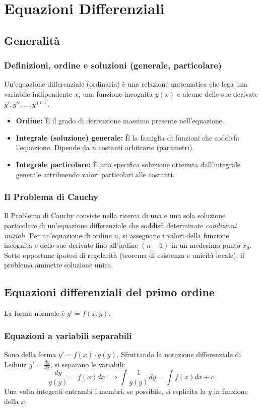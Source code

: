 \section{Equazioni Differenziali}
\subsection{Generalità}
\subsubsection{Definizioni, ordine e soluzioni (generale, particolare)}
Un'equazione differenziale (ordinaria) è una relazione matematica che lega una variabile indipendente $x$, una funzione incognita $y(x)$ e alcune delle sue derivate $y', y'', \dots, y^{(n)}$.
\begin{itemize}
    \item \textbf{Ordine:} È il grado di derivazione massimo presente nell'equazione.
    \item \textbf{Integrale (soluzione) generale:} È la famiglia di funzioni che soddisfa l'equazione. Dipende da $n$ costanti arbitrarie (parametri).
    \item \textbf{Integrale particolare:} È una specifica soluzione ottenuta dall'integrale generale attribuendo valori particolari alle costanti.
\end{itemize}

\subsubsection{Il Problema di Cauchy}
Il Problema di Cauchy consiste nella ricerca di una e una sola soluzione particolare di un'equazione differenziale che soddisfi determinate \textit{condizioni iniziali}. Per un'equazione di ordine $n$, si assegnano i valori della funzione incognita e delle sue derivate fino all'ordine $(n-1)$ in un medesimo punto $x_0$. Sotto opportune ipotesi di regolarità (teorema di esistenza e unicità locale), il problema ammette soluzione unica.

\subsection{Equazioni differenziali del primo ordine}
La forma normale è $y' = f(x, y)$.

\subsubsection{Equazioni a variabili separabili}
Sono della forma $y' = f(x) \cdot g(y)$. Sfruttando la notazione differenziale di Leibniz $y' = \frac{dy}{dx}$, si separano le variabili:
\[ \frac{dy}{g(y)} = f(x) dx \implies \int \frac{1}{g(y)} dy = \int f(x) dx + c \]
Una volta integrati entrambi i membri, se possibile, si esplicita la $y$ in funzione della $x$.

